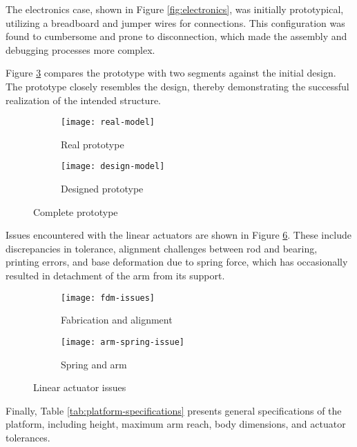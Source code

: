 The electronics case, shown in Figure \ref{fig:electronics}, was initially prototypical, utilizing a breadboard and jumper wires for connections. This configuration was found to cumbersome and prone to disconnection, which made the assembly and debugging processes more complex.

Figure \ref{fig:complete-prototype} compares the prototype with two segments against the initial design. The prototype closely resembles the design, thereby demonstrating the successful realization of the intended structure.

\begin{figure}[H]
    \centering
    \begin{subfigure}[b]{0.3\textwidth}
        \texttt{[image: real-model]}
        \caption{Real prototype}
        \label{fig:real-model}
    \end{subfigure}
    \begin{subfigure}[b]{0.3\textwidth}
        \texttt{[image: design-model]}
        \caption{Designed prototype}
        \label{fig:design-model}
    \end{subfigure}
    \caption{Complete prototype}
    \label{fig:complete-prototype}
\end{figure}

Issues encountered with the linear actuators are shown in Figure \ref{fig:manufacturing-issues}. These include discrepancies in tolerance, alignment challenges between rod and bearing, printing errors, and base deformation due to spring force, which has occasionally resulted in detachment of the arm from its support.

\begin{figure}[H]
    \centering
    \begin{subfigure}[t]{0.6\textwidth}
        \texttt{[image: fdm-issues]}
        \caption{Fabrication and alignment}
        \label{fig:fdm-issues}
    \end{subfigure}
    \begin{subfigure}[t]{0.3\textwidth}
        \texttt{[image: arm-spring-issue]}
        \caption{Spring and arm}
        \label{fig:arm-spring-issue}
    \end{subfigure}
    \caption{Linear actuator issues}
    \label{fig:manufacturing-issues}
\end{figure}


Finally, Table \ref{tab:platform-specifications} presents general specifications of the platform, including height, maximum arm reach, body dimensions, and actuator tolerances.


